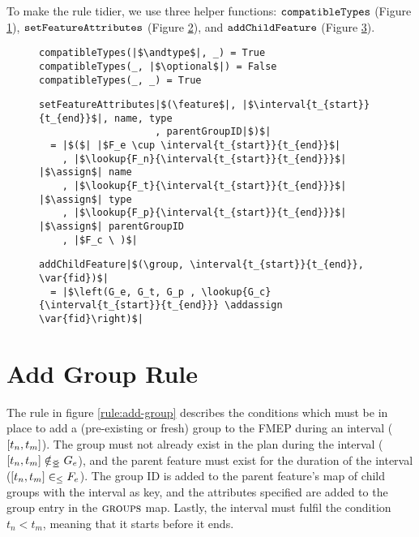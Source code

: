 To make the rule tidier, we use three helper functions: $\texttt{compatibleTypes}$ (Figure \ref{fun:compatible-types}), $\texttt{setFeatureAttributes}$ (Figure \ref{fun:set-feature-attributes}), and $\texttt{addChildFeature}$ (Figure \ref{fun:add-child-feature}). 

\begin{figure}
  \begin{verbatim}
compatibleTypes(|$\andtype$|, _) = True
compatibleTypes(_, |$\optional$|) = False
compatibleTypes(_, _) = True
  \end{verbatim}
  \caption{}
  \label{fun:compatible-types}
\end{figure}

\begin{figure}
  \begin{verbatim}
setFeatureAttributes|$(\feature$|, |$\interval{t_{start}}{t_{end}}$|, name, type
                    , parentGroupID|$)$|
  = |$($| |$F_e \cup \interval{t_{start}}{t_{end}}$|
    , |$\lookup{F_n}{\interval{t_{start}}{t_{end}}}$| |$\assign$| name
    , |$\lookup{F_t}{\interval{t_{start}}{t_{end}}}$| |$\assign$| type
    , |$\lookup{F_p}{\interval{t_{start}}{t_{end}}}$| |$\assign$| parentGroupID
    , |$F_c \ )$|
   \end{verbatim}
  \caption{}
  \label{fun:set-feature-attributes}
\end{figure}

\begin{figure}
  \begin{verbatim}
addChildFeature|$(\group, \interval{t_{start}}{t_{end}}, \var{fid})$|
  = |$\left(G_e, G_t, G_p , \lookup{G_c}{\interval{t_{start}}{t_{end}}} \addassign \var{fid}\right)$|
  \end{verbatim}
  \caption{}
  \label{fun:add-child-feature}
\end{figure}

\section{Add Group Rule}
\label{sec:add-group-rule}
The rule in figure \ref{rule:add-group} describes the conditions which must be in place to add a (pre-existing or fresh) group to the FMEP during an interval ($\interval{t_n}{t_m}$). The group must not already exist in the plan during the interval ($\interval{t_n}{t_m} \notinnr G_e$), and the parent feature must exist for the duration of the interval ($\interval{t_n}{t_m} \inn F_e$). The group ID is added to the parent feature's map of child groups with the interval as key, and the attributes specified are added to the group entry in the $\textsc{groups}{}$ map. Lastly, the interval must fulfil the condition $t_n < t_m$, meaning that it starts before it ends.

